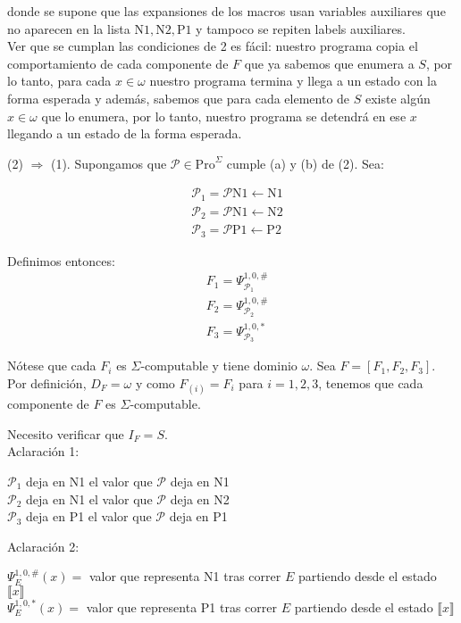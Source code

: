 \documentclass{article}
\begin{document}
donde se supone que las expansiones de los macros usan variables auxiliares que no aparecen en la lista $\text{N1}, \text{N2}, \text{P1}$ y tampoco se repiten labels auxiliares.\\
Ver que se cumplan las condiciones de 2 es fácil: nuestro programa copia el comportamiento de cada componente de $F$ que ya sabemos que enumera a $S$, por lo tanto, para cada $x\in \omega$ nuestro programa termina y llega a un estado con la forma esperada y además, sabemos que para cada elemento de $S$ existe algún $x \in \omega$ que lo enumera, por lo tanto, nuestro programa se detendrá en ese $x$ llegando a un estado de la forma esperada. 
\medskip

(2) $\Rightarrow$ (1). Supongamos que $\mathcal{P} \in \text{Pro}^\Sigma$ cumple (a) y (b) de (2). Sea:

\[
\begin{aligned}
&\mathcal{P}_1 = \mathcal{P} \text{N1} \leftarrow \text{N1} \\
&\mathcal{P}_2 = \mathcal{P} \text{N1} \leftarrow \text{N2} \\
&\mathcal{P}_3 = \mathcal{P}\text{P1} \leftarrow \text{P2}
\end{aligned}
\]

Definimos entonces:
\[
\begin{aligned}
&F_1 = \Psi^{1,0,\#}_{\mathcal{P}_1} \\
&F_2 = \Psi^{1,0,\#}_{\mathcal{P}_2} \\
&F_3 = \Psi^{1,0,*}_{\mathcal{P}_3}
\end{aligned}
\]

Nótese que cada $F_i$ es $\Sigma$-computable y tiene dominio $\omega$. Sea $F = [F_1, F_2, F_3]$. Por definición, $D_F = \omega$ y como $F_{(i)} = F_i$ para $i = 1, 2, 3$, tenemos que cada componente de $F$ es $\Sigma$-computable.

Necesito verificar que $I_F = S$. \\
Aclaración 1: 
\begin{center}
    $\mathcal{P}_1$ deja en N1 el valor que $\mathcal{P}$ deja en N1\\
    $\mathcal{P}_2$ deja en N1 el valor que $\mathcal{P}$ deja en N2\\
    $\mathcal{P}_3$ deja en P1 el valor que $\mathcal{P}$ deja en P1\\
\end{center}
Aclaración 2:
\begin{center}
    $\Psi_E^{1, 0, \#}(x) = $ valor que representa N1 tras correr $E$ partiendo desde el estado $\llbracket x \rrbracket$\\
    $\Psi_E^{1, 0, *}(x) = $ valor que representa P1 tras correr $E$ partiendo desde el estado $\llbracket x \rrbracket$\\  
\end{center}
\bigskip
\end{document}
